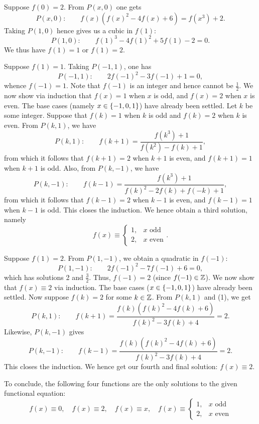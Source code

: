 \begin{solution*}
     Suppose $f(0) = 2$. From $P(x, 0)$ one gets \[P(x, 0) : \qquad f(x)(f(x)^2 - 4f(x) + 6) = f(x^3) + 2. \tag{1}\] Taking $P(1, 0)$ hence gives us a cubic in $f(1)$: \[P(1, 0) : \qquad f(1)^3 - 4f(1)^2 + 5f(1) - 2 = 0.\] We thus have $f(1) = 1$ or $f(1) = 2$.

     Suppose $f(1) = 1$. Taking $P(-1, 1)$, one has \[P(-1, 1): \qquad 2f(-1)^2 - 3f(-1) + 1 = 0,\] whence $f(-1) = 1$. Note that $f(-1)$ is an integer and hence cannot be $\frac12$. We now show via induction that $f(x) = 1$ when $x$ is odd, and $f(x) = 2$ when $x$ is even. The base cases (namely $x \in \left\lbrace -1, 0, 1 \right\rbrace$) have already been settled. Let $k$ be some integer. Suppose that $f(k) = 1$ when $k$ is odd and $f(k) = 2$ when $k$ is even. From $P(k, 1)$, we have
    \[P(k, 1) : \qquad f(k + 1) = \frac{f(k^3) + 1}{f(k^2) - f(k) + 1},\] from which it follows that $f(k + 1) = 2$ when $k + 1$ is even, and $f(k + 1) = 1$ when $k + 1$ is odd. Also, from $P(k, -1)$, we have \[P(k, -1) : \qquad f(k-1) = \frac{f(k^3) + 1}{f(k)^2 - 2f(k) + f(-k) + 1},\] from which it follows that $f(k - 1) = 2$ when $k - 1$ is even, and $f(k - 1) = 1$ when $k - 1$ is odd. This closes the induction. We hence obtain a third solution, namely \[f(x) \equiv \begin{cases}
        1, &\text{$x$ odd}\\
        2, &\text{$x$ even}
    \end{cases}.\]

     Suppose $f(1) = 2$. From $P(1, -1)$, we obtain a quadratic in $f(-1)$: \[P(1, -1) : \qquad 2f(-1)^2 - 7f(-1) + 6 = 0,\] which has solutions 2 and $\frac32$. Thus, $f(-1) = 2$ (since $f(-1) \in \mathbb{Z}$). We now show that $f(x) \equiv 2$ via induction. The base cases ($x \in \left\lbrace -1, 0, 1 \right\rbrace$) have already been settled. Now suppose $f(k) = 2$ for some $k \in \mathbb{Z}$. From $P(k, 1)$ and (1), we get \[P(k, 1) : \qquad f(k+1) = \frac{f(k)(f(k)^2 - 4f(k) + 6)}{f(k)^2 - 3f(k) + 4} = 2.\] Likewise, $P(k, -1)$ gives \[P(k, -1) : \qquad f(k-1) = \frac{f(k)(f(k)^2 - 4f(k) + 6)}{f(k)^2 - 3f(k) + 4} = 2.\] This closes the induction. We hence get our fourth and final solution: $f(x) \equiv 2$.

    To conclude, the following four functions are the only solutions to the given functional equation: \[f(x) \equiv 0, \quad f(x) \equiv 2, \quad f(x) \equiv x, \quad f(x) \equiv \begin{cases}
        1, &\text{$x$ odd}\\
        2, &\text{$x$ even}
    \end{cases}\]
\end{solution*}

